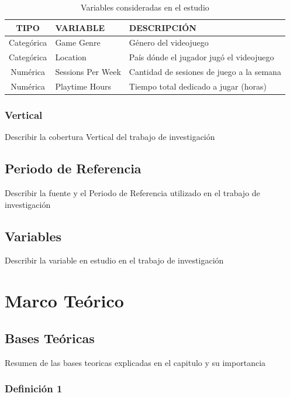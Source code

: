 \documentclass[oneside,11pt]{Latex/Classes/PhDthesisPSnPDF}
\begin{document}
\begin{table}[ht]
\centering
\caption{Variables consideradas en el estudio} 
\resizebox{10cm}{!} {
\begin{tabular}{cll}
  \hline
  \textbf{TIPO} & \textbf{VARIABLE} & \textbf{DESCRIPCIÓN} \\ 
  \hline
  Categórica & Game Genre & Género del videojuego \\ 
  Categórica & Location & País dónde el jugador jugó el videojuego \\ 
  Numérica & Sessions Per Week & Cantidad de sesiones de juego a la semana \\
  Numérica & Playtime Hours & Tiempo total dedicado a jugar (horas) \\ 
   \hline
\end{tabular}
}
\end{table}

\subsection{Vertical}

Describir la cobertura Vertical del trabajo de investigación

\section{Periodo de Referencia}

Describir la fuente y el Periodo de Referencia utilizado en el trabajo
de investigación

\section{Variables}

Describir la variable en estudio en el trabajo de investigación

\chapter{Marco Teórico}

\section{Bases Teóricas}

Resumen de las bases teoricas explicadas en el capitulo y su
importancia\\

\subsection{Definición 1}
\end{document}
